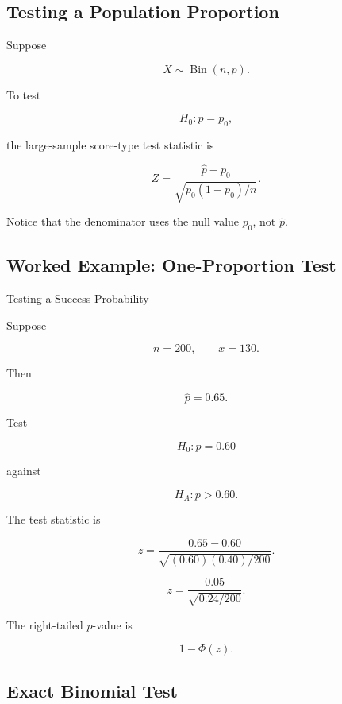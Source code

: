 \subsection{Testing a Population Proportion}
\label{subsec:one-proportion-test}

Suppose

\[
X\sim\operatorname{Bin}(n,p).
\]

To test

\[
H_0:p=p_0,
\]

the large-sample score-type test statistic is

\[
\boxed{
Z
=
\frac{
\widehat{p}-p_0
}{
\sqrt{
p_0(1-p_0)/n
}
}.
}
\]

Notice that the denominator uses the null value \(p_0\), not
\(\widehat{p}\).

\subsection{Worked Example: One-Proportion Test}
\label{subsec:worked-one-proportion-test}

\begin{workedexamplebox}{Testing a Success Probability}

Suppose

\[
n=200,
\qquad
x=130.
\]

Then

\[
\widehat{p}
=
0.65.
\]

Test

\[
H_0:p=0.60
\]

against

\[
H_A:p>0.60.
\]

The test statistic is

\[
z
=
\frac{
0.65-0.60
}{
\sqrt{
(0.60)(0.40)/200
}
}.
\]

\begin{answerbox}
\[
\boxed{
z
=
\frac{0.05}{
\sqrt{0.24/200}
}.
}
\]
\end{answerbox}

The right-tailed \(p\)-value is

\[
1-\Phi(z).
\]

\end{workedexamplebox}

\subsection{Exact Binomial Test}
\label{subsec:exact-binomial-test}


